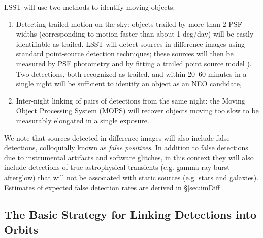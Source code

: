 LSST will use two methods to identify moving objects:
\begin{enumerate}
\item Detecting trailed motion on the sky: objects trailed by more
  than 2 PSF widths (corresponding to motion faster than about 1
  deg/day) will be easily identifiable as trailed. LSST will detect sources in 
  difference images using standard point-source detection techniques;
  these sources will then be measured by PSF photometry and by fitting a trailed
  point source model \citep[see][Footnote 41]{LSE-163}).
  Two detections, both recognized as trailed, and within 20--60 minutes in a single night
  will be sufficient to identify an object as an NEO candidate,
\item Inter-night linking of pairs of detections from the same night: the Moving Object 
Processing System (MOPS) will recover objects moving too slow to be measurably elongated in a single exposure.
\end{enumerate}

We note that sources detected in difference images \citep[\DIASources in LSST parlance, see][]{LSE-163}
will also include false detections, colloquially known as {\it false positives}.
In addition to false detections due to instrumental artifacts and software glitches,
in this context they will also include detections of true astrophysical transients
(e.g. gamma-ray burst afterglow) that will not be associated with static sources
(e.g. stars and galaxies). Estimates of expected false detection rates are derived
in \S\ref{sec:imDiff}.



\subsection{The Basic Strategy for Linking Detections into Orbits}


